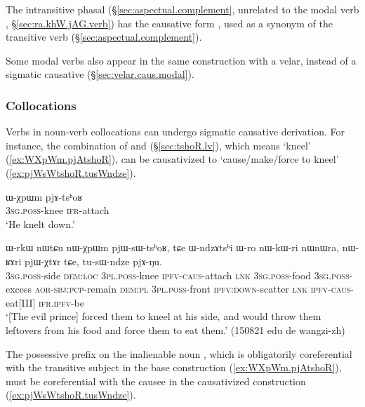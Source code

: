 The intransitive phasal  (§\ref{sec:aspectual.complement}, unrelated to the modal verb , §\ref{sec:ra.khW.jAG.verb}) has the causative form , used as a synonym of the transitive verb  (§\ref{sec:aspectual.complement}).

Some modal verbs also appear in the same construction with a velar, instead of a sigmatic causative (§\ref{sec:velar.caus.modal}).

\subsubsection{Collocations} \label{sec:sig.caus.collocations}
 
Verbs in noun-verb collocations can undergo sigmatic causative derivation. For instance, the combination of  and  (§\ref{sec:tshoR.lv}), which means `kneel' (\ref{ex:WXpWm.pjAtshoR}), can be causativized to  `cause/make/force to kneel' (\ref{ex:pjWsWtshoR.tusWndze}).

\begin{exe}
\ex \label{ex:WXpWm.pjAtshoR}
\gll ɯ-χpɯm pjɤ-tsʰoʁ \\
\textsc{3sg}.\textsc{poss}-knee \textsc{ifr}-attach \\
\glt `He knelt down.' 
\end{exe}

\begin{exe}
\ex \label{ex:pjWsWtshoR.tusWndze}
\gll ɯ-rkɯ nɯtɕu nɯ-χpɯm pjɯ-sɯ-tsʰoʁ, tɕe ɯ-ndzɤtsʰi ɯ-ro nɯ-kɯ-ri nɯnɯra, nɯ-ʁɤri pjɯ-χtɤr tɕe, tu-sɯ-ndze pjɤ-ŋu. \\
\textsc{3sg}.\textsc{poss}-side \textsc{dem}:\textsc{loc} \textsc{3pl}.\textsc{poss}-knee \textsc{ipfv}-\textsc{caus}-attach \textsc{lnk} \textsc{3sg}.\textsc{poss}-food \textsc{3sg}.\textsc{poss}-excess \textsc{aor}-\textsc{sbj}:\textsc{pcp}-remain \textsc{dem}:\textsc{pl} \textsc{3pl}.\textsc{poss}-front \textsc{ipfv}:\textsc{down}-scatter \textsc{lnk} \textsc{ipfv}-\textsc{caus}-eat[III] \textsc{ifr}.\textsc{ipfv}-be \\
\glt `[The evil prince] forced them to kneel at his side, and would throw them leftovers from his food and force them to eat them.' (150821 edu de wangzi-zh)
\end{exe}

The possessive prefix on the inalienable noun , which is obligatorily coreferential with the transitive subject in the base construction (\ref{ex:WXpWm.pjAtshoR}), must be coreferential with the causee in the causativized construction (\ref{ex:pjWsWtshoR.tusWndze}).

